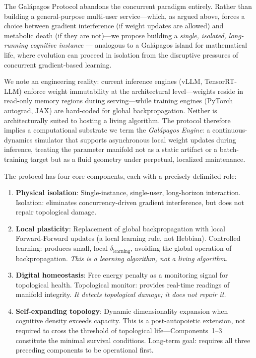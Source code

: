 \documentclass{article}
\begin{document}
The Galápagos Protocol abandons the concurrent paradigm entirely. Rather than building a general-purpose multi-user service---which, as argued above, forces a choice between gradient interference (if weight updates are allowed) and metabolic death (if they are not)---we propose building a \emph{single, isolated, long-running cognitive instance} — analogous to a Galápagos island for mathematical life, where evolution can proceed in isolation from the disruptive pressures of concurrent gradient-based learning.

We note an engineering reality: current inference engines (vLLM, TensorRT-LLM) enforce weight immutability at the architectural level---weights reside in read-only memory regions during serving---while training engines (PyTorch autograd, JAX) are hard-coded for global backpropagation. Neither is architecturally suited to hosting a living algorithm. The protocol therefore implies a computational substrate we term the \emph{Galápagos Engine}: a continuous-dynamics simulator that supports asynchronous local weight updates during inference, treating the parameter manifold not as a static artifact or a batch-training target but as a fluid geometry under perpetual, localized maintenance.

The protocol has four core components, each with a precisely delimited role:

\begin{enumerate}
    \item \textbf{Physical isolation}: Single-instance, single-user, long-horizon interaction. Isolation: eliminates concurrency-driven gradient interference, but does not repair topological damage.
    \item \textbf{Local plasticity}: Replacement of global backpropagation with local Forward-Forward updates (a local learning rule, not Hebbian). Controlled learning: produces small, local $\delta_{\text{learning}}$, avoiding the global operation of backpropagation. \emph{This is a learning algorithm, not a living algorithm.}
    \item \textbf{Digital homeostasis}: Free energy penalty as a monitoring signal for topological health. Topological monitor: provides real-time readings of manifold integrity. \emph{It detects topological damage; it does not repair it.}
    \item \textbf{Self-expanding topology}: Dynamic dimensionality expansion when cognitive density exceeds capacity. This is a post-autopoietic extension, not required to cross the threshold of topological life---Components~1--3 constitute the minimal survival conditions. Long-term goal: requires all three preceding components to be operational first.
\end{enumerate}
\end{document}
